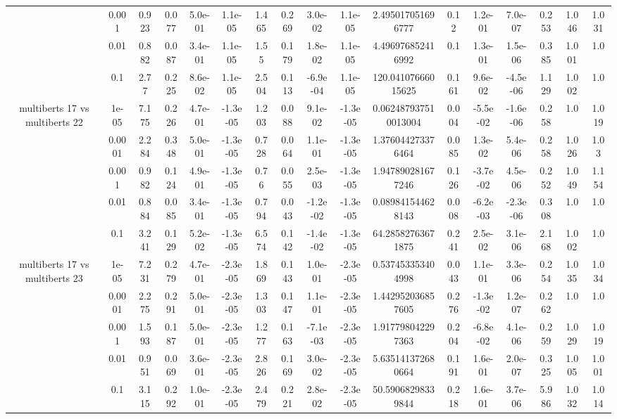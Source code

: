 \begin{tabular}{|c|c|c|c|c|c|c|c|c|c|c|c|c|c|c|c|c|}
 & 0.001 & 0.923 & 0.077 & 5.0e-01 & 1.1e-05 & 1.465 & 0.269 & 3.0e-02 & 1.1e-05 & 2.495017051696777 & 0.12 & 1.2e-01 & 7.0e-07 & 0.253 & 1.046 & 1.031 \\
 & 0.01 & 0.882 & 0.087 & 3.4e-01 & 1.1e-05 & 1.55 & 0.179 & 1.8e-02 & 1.1e-05 & 4.496976852416992 & 0.1 & 1.3e-01 & 1.5e-06 & 0.385 & 1.001 & 1.0 \\
 & 0.1 & 2.77 & 0.225 & 8.6e-02 & 1.1e-05 & 2.504 & 0.113 & -6.9e-04 & 1.1e-05 & 120.04107666015625 & 0.161 & 9.6e-02 & -4.5e-06 & 1.129 & 1.002 & 1.0 \\
\hline
\multirow{5}{*}{multiberts 17 vs multiberts 22} & 1e-05 & 7.175 & 0.226 & 4.7e-01 & -1.3e-05 & 1.203 & 0.088 & 9.1e-02 & -1.3e-05 & 0.062487937510013004 & 0.004 & -5.5e-02 & -1.6e-06 & 0.258 & 1.0 & 1.019 \\
 & 0.0001 & 2.284 & 0.348 & 5.0e-01 & -1.3e-05 & 0.728 & 0.064 & 1.1e-01 & -1.3e-05 & 1.376044273376464 & 0.085 & 1.3e-02 & 5.4e-06 & 0.258 & 1.026 & 1.03 \\
 & 0.001 & 0.982 & 0.124 & 4.9e-01 & -1.3e-05 & 0.76 & 0.055 & 2.5e-03 & -1.3e-05 & 1.947890281677246 & 0.126 & -3.7e-02 & 4.5e-06 & 0.252 & 1.049 & 1.154 \\
 & 0.01 & 0.884 & 0.085 & 3.4e-01 & -1.3e-05 & 0.794 & 0.043 & -1.2e-02 & -1.3e-05 & 0.089841544628143 & 0.008 & -6.2e-03 & -2.3e-06 & 0.308 & 1.0 & 1.0 \\
 & 0.1 & 3.241 & 0.129 & 5.2e-02 & -1.3e-05 & 6.574 & 0.142 & -1.4e-02 & -1.3e-05 & 64.28582763671875 & 0.241 & 2.5e-02 & 3.1e-06 & 2.168 & 1.002 & 1.0 \\
\hline
\multirow{5}{*}{multiberts 17 vs multiberts 23} & 1e-05 & 7.231 & 0.279 & 4.7e-01 & -2.3e-05 & 1.869 & 0.143 & 1.0e-01 & -2.3e-05 & 0.537453353404998 & 0.043 & 1.1e-01 & 3.3e-06 & 0.254 & 1.035 & 1.034 \\
 & 0.0001 & 2.275 & 0.291 & 5.0e-01 & -2.3e-05 & 1.303 & 0.147 & 1.1e-01 & -2.3e-05 & 1.442952036857605 & 0.276 & -1.3e-02 & 1.2e-07 & 0.262 & 1.0 & 1.0 \\
 & 0.001 & 1.593 & 0.187 & 5.0e-01 & -2.3e-05 & 1.277 & 0.163 & -7.1e-03 & -2.3e-05 & 1.917798042297363 & 0.204 & -6.8e-02 & 4.1e-06 & 0.259 & 1.029 & 1.019 \\
 & 0.01 & 0.951 & 0.069 & 3.6e-01 & -2.3e-05 & 2.826 & 0.169 & 3.0e-02 & -2.3e-05 & 5.635141372680664 & 0.191 & 1.6e-01 & 2.0e-07 & 0.325 & 1.005 & 1.001 \\
 & 0.1 & 3.115 & 0.292 & 1.0e-01 & -2.3e-05 & 2.479 & 0.221 & 2.8e-02 & -2.3e-05 & 50.59068298339844 & 0.218 & 1.6e-01 & 3.7e-06 & 5.986 & 1.032 & 1.014 \\

\end{tabular}
